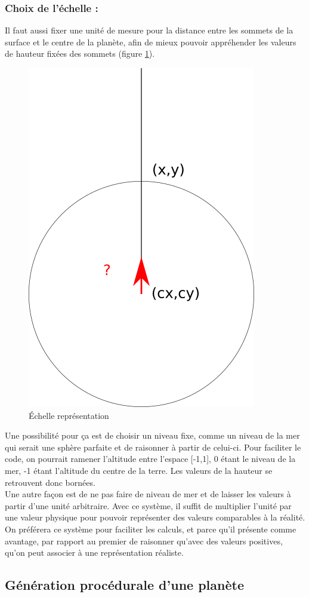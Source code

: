 \documentclass[a4paper]{article}
\begin{document}
            \subsubsection {Choix de l'échelle :}
            
            Il faut aussi fixer une unité de mesure pour la distance entre les sommets de la surface et le centre de la planète, afin de mieux pouvoir appréhender les valeurs de hauteur fixées des sommets (figure \ref{echelle}).\\
            
            \begin{figure}[!h]
            \begin{center}
            \includegraphics[width=0.2\linewidth]{img/echelle.png}
            \caption{Échelle représentation}
            \label{echelle}
            \end{center}
            \end{figure}
            
            Une possibilité pour ça est de choisir un niveau fixe, comme un niveau de la mer qui serait une sphère parfaite et de raisonner à partir de celui-ci. Pour faciliter le code, on pourrait ramener l'altitude entre l'espace [-1,1], 0 étant le niveau de la mer, -1 étant l'altitude du centre de la terre. Les valeurs de la hauteur se retrouvent donc bornées.\\
            
            Une autre façon est de ne pas faire de niveau de mer et de laisser les valeurs à partir d'une unité arbitraire. Avec ce système, il suffit de multiplier l'unité par une valeur physique pour pouvoir représenter des valeurs comparables à la réalité. On préférera ce système pour faciliter les calculs, et parce qu'il présente comme avantage, par rapport au premier de raisonner qu'avec des valeurs positives, qu'on peut associer à une représentation réaliste.\\
            
            
\subsection{Génération procédurale d'une planète}
    
\end{document}
